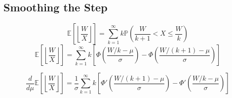 \subsection{Smoothing the Step}

\[
\mathbb{E}\left[\left\lfloor\frac{W}{X}\right\rfloor\right]=\sum_{k=1}^{\infty}k\mathbb{P}\left(\frac{W}{k+1}<X\leq\frac{W}{k}\right)
\]
\[
\mathbb{E}\left[\left\lfloor\frac{W}{X}\right\rfloor\right]=\sum_{k=1}^{\infty}k\left[\Phi\left(\frac{W/k-\mu}{\sigma}\right)-\Phi\left(\frac{W/(k+1)-\mu}{\sigma}\right)\right]
\]

\[
\frac{d}{d\mu}\mathbb{E}\left[\left\lfloor\frac{W}{X}\right\rfloor\right]=\frac{1}{\sigma}\sum_{k=1}^{\infty}k\left[\Phi'\left(\frac{W/(k+1)-\mu}{\sigma}\right)-\Phi'\left(\frac{W/k-\mu}{\sigma}\right)\right]
\]